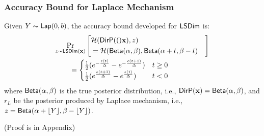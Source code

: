 \documentclass{article}
\begin{document}
\subsubsection{Accuracy Bound for Laplace Mechanism}
\label{subsec_accuracy_lap}
\begin{lem}
\label{lem_acc_lap}
Given $Y \thicksim \mathsf{Lap}(0, b)$, the accuracy bound developed for $\mathsf{LSDim}$ is:
\begin{align*}
&
\lapmechPr{\dataobs}{
\begin{aligned}
\lefteqn{\hellinger(\bysinfer(\dataobs), z )}\\ 
&= \hellinger(\betad(\alpha, \beta), \betad(\alpha + t, \beta - t)
\end{aligned}
}
\\
&\qquad = 
\begin{cases}
\frac{1}{2} (e^{- \frac{\epsilon (t)}{\Delta }} - e^{- \frac{\epsilon (t + 1)}{\Delta }}) &  t \geq 0\\
\frac{1}{2} (e^{\frac{\epsilon (t + 1)}{\Delta }} - e^{\frac{\epsilon (t)}{\Delta }}) & t < 0
\end{cases}
\end{align*}
where $\mathsf{Beta}(\alpha, \beta)$ is the true posterior distribution, i.e., $\mathsf{DirP}(\textbf{x}) = \mathsf{Beta}(\alpha, \beta)$, and $r_L$ be the posterior produced by Laplace mechanism, i.e., $z = \mathsf{Beta}(\alpha + \lfloor Y \rfloor, \beta - \lfloor Y \rfloor)$.
\end{lem}
(Proof is in Appendix)
\end{document}
